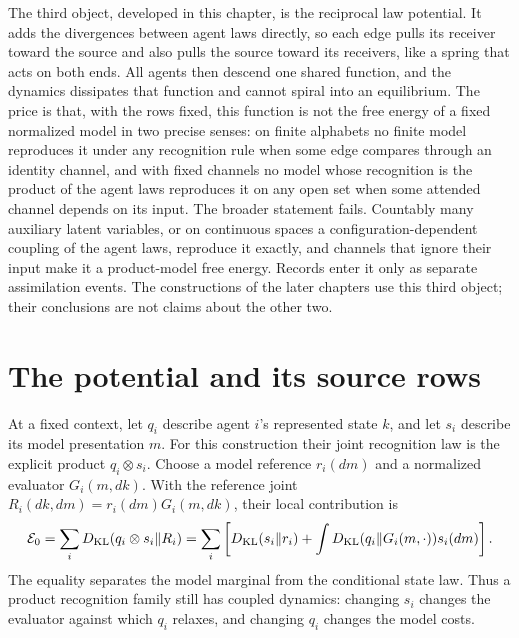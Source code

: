 The third object, developed in this chapter, is the reciprocal law potential. It adds the divergences between agent laws directly, so each edge pulls its receiver toward the source and also pulls the source toward its receivers, like a spring that acts on both ends. All agents then descend one shared function, and the dynamics dissipates that function and cannot spiral into an equilibrium. The price is that, with the rows fixed, this function is not the free energy of a fixed normalized model in two precise senses: on finite alphabets no finite model reproduces it under any recognition rule when some edge compares through an identity channel, and with fixed channels no model whose recognition is the product of the agent laws reproduces it on any open set when some attended channel depends on its input. The broader statement fails. Countably many auxiliary latent variables, or on continuous spaces a configuration-dependent coupling of the agent laws, reproduce it exactly, and channels that ignore their input make it a product-model free energy. Records enter it only as separate assimilation events. The constructions of the later chapters use this third object; their conclusions are not claims about the other two.

\section{The potential and its source rows}

At a fixed context, let $q_i$ describe agent $i$'s represented state $k$, and let $s_i$ describe its model presentation $m$. For this construction their joint recognition law is the explicit product $q_i\otimes s_i$. Choose a model reference $r_i(dm)$ and a normalized evaluator $G_i(m,dk)$. With the reference joint $R_i(dk,dm)=r_i(dm)G_i(m,dk)$, their local contribution is
\begin{equation}
 \mathcal E_0=\sum_iD_{\mathrm{KL}}(q_i\otimes s_i\Vert R_i)
 =\sum_i\left[D_{\mathrm{KL}}(s_i\Vert r_i)
       +\int D_{\mathrm{KL}}(q_i\Vert G_i(m,\cdot))s_i(dm)\right].
 \label{eq:comp-local-potential}
\end{equation}
The equality separates the model marginal from the conditional state law. Thus a product recognition family still has coupled dynamics: changing $s_i$ changes the evaluator against which $q_i$ relaxes, and changing $q_i$ changes the model costs.


